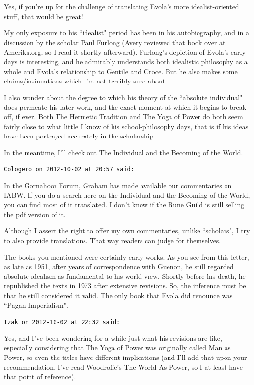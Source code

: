 \begin{footnotesize}
\begin{sffamily}
Yes, if you're up for the challenge of translating Evola's more idealist-oriented stuff, that would be great! 

My only exposure to his ``idealist" period has been in his autobiography, and in a discussion by the scholar Paul Furlong (Avery reviewed that book over at Amerika.org, so I read it shortly afterward). Furlong's depiction of Evola's early days is interesting, and he admirably understands both idealistic philosophy as a whole and Evola's relationship to Gentile and Croce. But he also makes some claims/insinuations which I'm not terribly sure about.

I also wonder about the degree to which his theory of the ``absolute individual" does permeate his later work, and the exact moment at which it begins to break off, if ever. Both The Hermetic Tradition and The Yoga of Power do both seem fairly close to what little I know of his school-philosophy days, that is if his ideas have been portrayed accurately in the scholarship. 

In the meantime, I'll check out The Individual and the Becoming of the World.


\hfill

\texttt{Cologero on 2012-10-02 at 20:57 said: }

In the Gornahoor Forum, Graham has made available our commentaries on IABW. If you do a search here on the Individual and the Becoming of the World, you can find most of it translated. I don't know if the Rune Guild is still selling the pdf version of it.

Although I assert the right to offer my own commentaries, unlike ``scholars", I try to also provide translations. That way readers can judge for themselves.

The books you mentioned were certainly early works. As you see from this letter, as late as 1951, after years of correspondence with Guenon, he still regarded absolute idealism as fundamental to his world view. Shortly before his death, he republished the texts in 1973 after extensive revisions. So, the inference must be that he still considered it valid. The only book that Evola did renounce was ``Pagan Imperialism".


\hfill

\texttt{Izak on 2012-10-02 at 22:32 said: }

Yes, and I've been wondering for a while just what his revisions are like, especially considering that The Yoga of Power was originally called Man as Power, so even the titles have different implications (and I'll add that upon your recommendation, I've read Woodroffe's The World As Power, so I at least have that point of reference). 


\end{sffamily}
\end{footnotesize}
